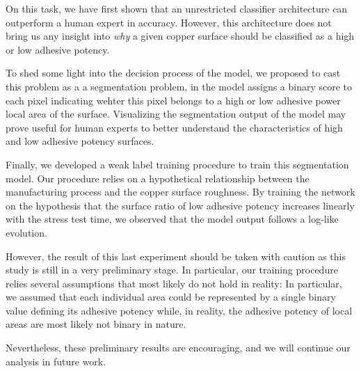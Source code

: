 \documentclass[10pt,twocolumn,letterpaper]{article}
\begin{document}
On this task, we have first shown that an unrestricted classifier 
architecture can outperform a human expert in accuracy.
However, this architecture does not bring us any insight 
into \textit{why} a given copper surface should be classified 
as a high or low adhesive potency.

To shed some light into the decision process of the model,
we proposed to cast this problem as a a segmentation problem, 
in the model assigns a binary score to each pixel indicating wehter this
pixel belongs to a high or low adhesive power local area of the surface.
Visualizing the segmentation output of the model may prove useful for 
human experts to better understand the characteristics of high and low 
adhesive potency surfaces.

Finally, we developed a weak label training procedure to train this segmentation model.
Our procedure relies on a hypothetical relationship between the manufacturing process and the
copper surface roughness.
By training the network on the hypothesis that the surface ratio of low adhesive potency increases
linearly with the stress test time, we observed that the model output follows a log-like evolution.

However, the result of this last experiment should be taken with caution as this study is still in a very preliminary stage.
In particular, our training procedure relies several assumptions that most likely do not hold in reality: 
In particular, we assumed that each individual area could be represented by a single binary value defining its adhesive potency
while, in reality, the adhesive potency of local areas are most likely not binary in nature.

Nevertheless, these preliminary results are encouraging, and we will continue our analysis in future work.


{\small
	
	
}
\end{document}
